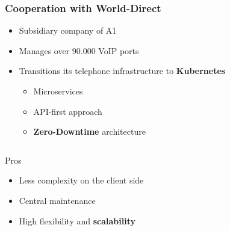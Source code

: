 \documentclass[11pt,t,usepdftitle=false,aspectratio=169]{beamer}
\begin{document}
\begin{frame}
	\frametitle{Cooperation with {\color{uibkblue} World-Direct}}
	
	
	\begin{itemize}
		\item Subsidiary company of A1
		\item Manages over 90.000 VoIP ports
		\item Transitions its telephone infrastructure to \textbf{\color{uibkorange} Kubernetes}
		\begin{itemize}
			\item Microservices
			\item API-first approach
			\item \textbf{{\color{uibkorange} Zero-Downtime}} architecture
		\end{itemize}
	\end{itemize}
	
	\begin{columns}
		\begin{column}{0.5\textwidth}		
			\begin{block}{Pros}
				\begin{itemize}
					\item Less complexity on the client side
					\item Central maintenance
					\item High flexibility and \textbf{\color{uibkorange} scalability}
				\end{itemize}
			\end{block}
		\end{column}
		
		\begin{column}{0.5\textwidth}
		\end{column}
	\end{columns}
\end{frame}
\end{document}
